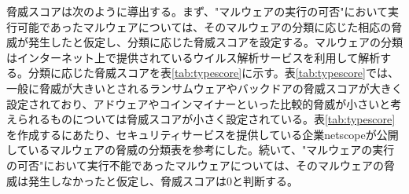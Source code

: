 \documentclass[12pt,a4paper,titlepage,report]{jsbook}
\begin{document}
脅威スコアは次のように導出する。まず、"マルウェアの実行の可否"において実行可能であったマルウェアについては、そのマルウェアの分類に応じた相応の脅威が発生したと仮定し、分類に応じた脅威スコアを設定する。マルウェアの分類はインターネット上で提供されているウイルス解析サービスを利用して解析する。分類に応じた脅威スコアを表\ref{tab:typescore}に示す。表\ref{tab:typescore}では、一般に脅威が大きいとされるランサムウェアやバックドアの脅威スコアが大きく設定されており、アドウェアやコインマイナーといった比較的脅威が小さいと考えられるものについては脅威スコアが小さく設定されている。表\ref{tab:typescore}を作成するにあたり、セキュリティサービスを提供している企業netscopeが公開しているマルウェアの脅威の分類表\cite{malwareclass}を参考にした。続いて、"マルウェアの実行の可否"において実行不能であったマルウェアについては、そのマルウェアの脅威は発生しなかったと仮定し、脅威スコアは0と判断する。


\begin{table}[htbp]
	\caption{マルウェアの分類と脅威スコアの対応表}
	\label{tab:typescore}
	\centering
	\\
\end{table}
\end{document}

